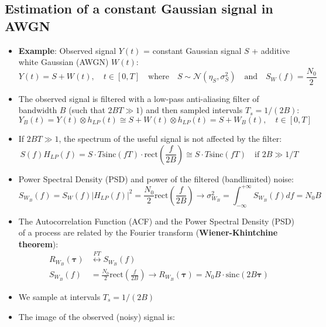 \subsection{Estimation of a constant Gaussian signal in AWGN}
\begin{itemize}
    \item \textbf{Example}: Observed signal \(Y(t)\) = constant Gaussian signal \(S\) + additive white Gaussian (AWGN) \(W(t)\):
    $$Y(t) = S + W(t), \quad t \in [0,T] \quad \text{where} \quad S \sim \mathcal{N}(\eta_S, \sigma_S^2) \quad \text{and} \quad S_W(f) = \frac{N_0}{2}$$
    \item The observed signal is filtered with a low-pass anti-aliasing filter of bandwidth \(B\) (such that \(2BT\gg1\)) and then sampled intervals \(T_s=1/(2B)\):
$$Y_B(t) = Y(t) \otimes h_{LP}(t) \cong S + W(t) \otimes h_{LP}(t) = S + W_B(t), \quad t \in [0,T]$$
    \item If \(2BT\gg 1\), the spectrum of the useful signal is not affected by the filter:
$$S(f) H_{LP}(f) = S \cdot T\text{sinc}(fT) \cdot \text{rect}\left(\frac{f}{2B}\right) \cong S \cdot T\text{sinc}(fT) \quad \text{if } 2B \gg 1/T$$
    \item Power Spectral Density (PSD) and power of the filtered (bandlimited) noise:
$$S_{W_B}(f) = S_W(f)|H_{LP}(f)|^2 = \frac{N_0}{2}\text{rect}\left(\frac{f}{2B}\right) \rightarrow \sigma_{W_B}^2 = \int_{-\infty}^{+\infty} S_{W_B}(f)df = N_0 B$$

    \item The Autocorrelation Function (ACF) and the Power Spectral Density (PSD) of a process are related by the Fourier transform (\textbf{Wiener-Khintchine theorem}):
    \begin{align*}
R_{W_B}(\boldsymbol{\tau}) &\stackrel{FT}{\longleftrightarrow} S_{W_B}(f) \\[1em]
S_{W_B}(f) &= \frac{N_0}{2}\text{rect}\left(\frac{f}{2B}\right) \rightarrow R_{W_B}(\boldsymbol{\tau}) = N_0 B \cdot \text{sinc}(2B\boldsymbol{\tau})
\end{align*}

\item We sample at intervals \(T_s=1/(2B)\)
\newpage
\item The image of the observed (noisy) signal is:


\end{itemize}
